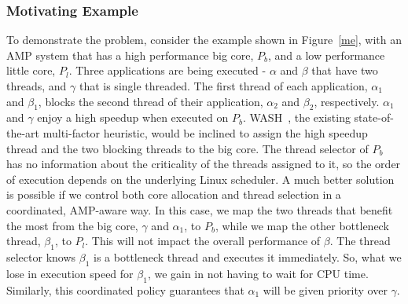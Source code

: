 \subsubsection*{Motivating Example} To demonstrate the problem, consider the example shown in Figure~\ref{me}, with an AMP system that has a high performance big core, $P_b$, and a low performance little core, $P_l$. Three applications are being executed - $\alpha$ and $\beta$ that have two threads, and $\gamma$ that is single threaded. 
The first thread of each application, $\alpha_1$ and $\beta_1$, blocks the second thread of their application, $\alpha_2$ and $\beta_2$, respectively. %
$\alpha_1$ and $\gamma$ enjoy a high speedup when executed on $P_b$. WASH~\cite{jibaja2016portable}, the existing state-of-the-art multi-factor heuristic, would be inclined to assign the high speedup thread and the two blocking threads to the big core. The thread selector of $P_b$ has no information about the criticality of the threads assigned to it, so the order of execution depends on the underlying Linux scheduler.
A much better solution is possible if we control both core allocation and thread selection in a coordinated, AMP-aware way. In this case, we map the two threads that benefit the most from the big core, $\gamma$ and $\alpha_1$, to $P_b$, while we map the other bottleneck thread, $\beta_1$, to $P_l$. This will not impact the overall performance of $\beta$. The thread selector knows $\beta_1$ is a bottleneck thread and executes it immediately. So, what we lose in execution speed for $\beta_1$, we gain in not having to wait for CPU time. Similarly, this coordinated policy guarantees that $\alpha_1$ will be given priority over $\gamma$. 


